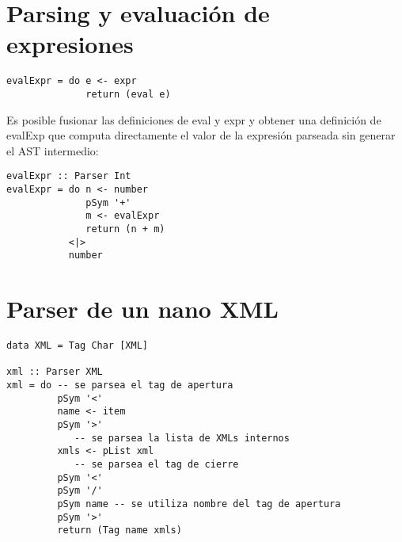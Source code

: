 \documentclass{article}
\begin{document}
\section{Parsing y evaluación de expresiones}

\begin{lstlisting}
evalExpr = do e <- expr
              return (eval e)
\end{lstlisting}
Es posible fusionar las definiciones de eval y expr y obtener una definición de evalExp que computa directamente el valor de la expresión parseada sin generar el AST intermedio:
\begin{lstlisting}
evalExpr :: Parser Int
evalExpr = do n <- number
              pSym '+'
              m <- evalExpr
              return (n + m)
           <|>
           number
\end{lstlisting}

\newpage

\section{Parser de un nano XML}

\begin{lstlisting}
data XML = Tag Char [XML]

xml :: Parser XML
xml = do -- se parsea el tag de apertura
         pSym '<'
         name <- item
         pSym '>'
            -- se parsea la lista de XMLs internos
         xmls <- pList xml
            -- se parsea el tag de cierre
         pSym '<'
         pSym '/'
         pSym name -- se utiliza nombre del tag de apertura
         pSym '>'
         return (Tag name xmls)
\end{lstlisting}
\end{document}
